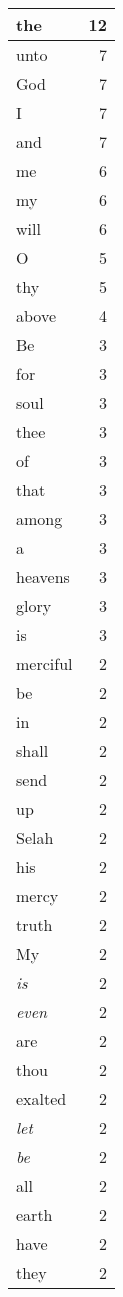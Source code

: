 \begin{center}
\begin{longtable}{l|r}
\hline \hline
\endlastfoot
the & 12 \\ \hline
unto & 7 \\ \hline
God & 7 \\ \hline
I & 7 \\ \hline
and & 7 \\ \hline
me & 6 \\ \hline
my & 6 \\ \hline
will & 6 \\ \hline
O & 5 \\ \hline
thy & 5 \\ \hline
above & 4 \\ \hline
Be & 3 \\ \hline
for & 3 \\ \hline
soul & 3 \\ \hline
thee & 3 \\ \hline
of & 3 \\ \hline
that & 3 \\ \hline
among & 3 \\ \hline
a & 3 \\ \hline
heavens & 3 \\ \hline
glory & 3 \\ \hline
is & 3 \\ \hline
merciful & 2 \\ \hline
be & 2 \\ \hline
in & 2 \\ \hline
shall & 2 \\ \hline
send & 2 \\ \hline
up & 2 \\ \hline
Selah & 2 \\ \hline
his & 2 \\ \hline
mercy & 2 \\ \hline
truth & 2 \\ \hline
My & 2 \\ \hline
\emph{is} & 2 \\ \hline
\emph{even} & 2 \\ \hline
are & 2 \\ \hline
thou & 2 \\ \hline
exalted & 2 \\ \hline
\emph{let} & 2 \\ \hline
\emph{be} & 2 \\ \hline
all & 2 \\ \hline
earth & 2 \\ \hline
have & 2 \\ \hline
they & 2 \\ \hline

\end{longtable}
\end{center}
